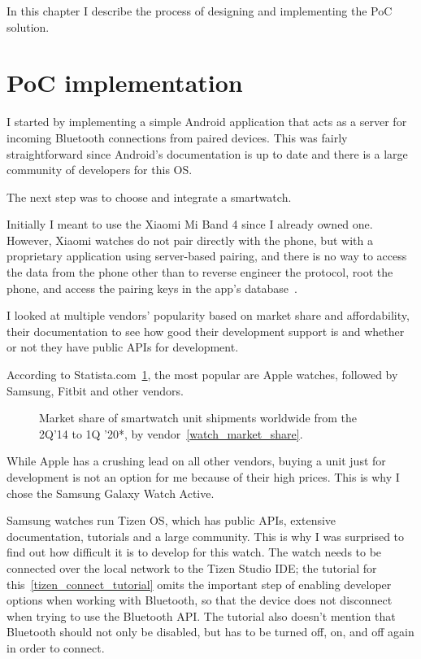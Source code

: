 In this chapter I describe the process of designing and implementing the PoC solution.

\section{PoC implementation}

I started by implementing a simple Android application that acts as a server for incoming Bluetooth connections from paired devices.
This was fairly straightforward since Android's documentation is up to date and there is a large community of developers for this OS.

The next step was to choose and integrate a smartwatch.

Initially I meant to use the Xiaomi Mi Band 4 since I already owned one.
However, Xiaomi watches do not pair directly with the phone, but with a proprietary application using server-based pairing,
and there is no way to access the data from the phone other than to reverse engineer the protocol, root the phone, and access the pairing keys in the app's database~\cite{miband4-server-based}.

I looked at multiple vendors' popularity based on market share and affordability, their documentation to see how good their development support is and whether or not they have public APIs for development.

According to Statista.com~\ref{fig:watch_market_share}, the most popular are Apple watches, followed by Samsung, Fitbit and other vendors.

\begin{figure}[h]
    \caption{Market share of smartwatch unit shipments worldwide from the 2Q'14 to 1Q '20*, by vendor~\ref{watch_market_share}.}
    \label{fig:watch_market_share}
\end{figure}

While Apple has a crushing lead on all other vendors, buying a unit just for development is not an option for me because of their high prices.
This is why I chose the Samsung Galaxy Watch Active.

Samsung watches run Tizen OS, which has public APIs, extensive documentation, tutorials and a large community.
This is why I was surprised to find out how difficult it is to develop for this watch.
The watch needs to be connected over the local network to the Tizen Studio IDE;
the tutorial for this~\ref{tizen_connect_tutorial} omits the important step of enabling developer options when working with Bluetooth,
so that the device does not disconnect when trying to use the Bluetooth API.
The tutorial also doesn't mention that Bluetooth should not only be disabled, but has to be turned off, on, and off again in order to connect.


